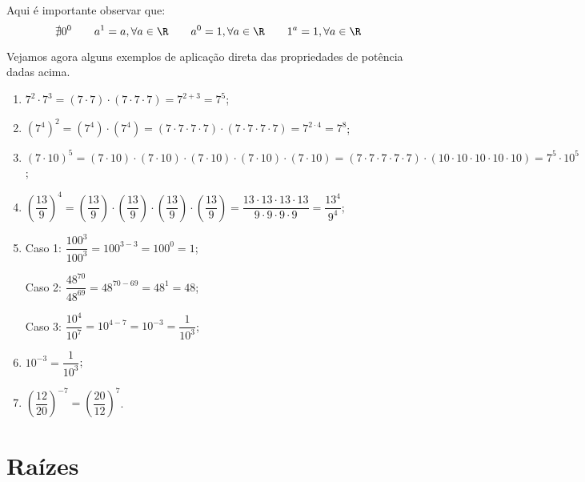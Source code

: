    \vskip0.3cm

 \colorbox{amarelo}{
 \begin{minipage}{0.9\linewidth}
 \begin{center}
 Aqui é importante observar que:
 \[
         \nexists 0^0
   \qquad a^1= a, \forall a \in \R
   \qquad a^0= 1, \forall a \in \R
   \qquad 1^a= 1, \forall a \in \R
 \]
 \end{center}
 \end{minipage}}

\vskip0.3cm

 \begin{exem} Vejamos agora alguns exemplos de aplicação direta das propriedades de potência dadas acima.
  \begin{enumerate}[P1)]
   \item $7^2 \cdot 7^3= (7 \cdot 7) \cdot (7 \cdot 7 \cdot 7)= 7^{2+3}= 7^5 $;
   \item $(7^4)^2= (7^4) \cdot (7^4)= (7 \cdot 7 \cdot 7 \cdot 7) \cdot (7 \cdot 7 \cdot 7 \cdot 7)= 7^{2 \cdot 4}= 7^8$;
   \item $(7 \cdot 10)^5= (7 \cdot 10) \cdot (7 \cdot 10) \cdot (7 \cdot 10) \cdot (7 \cdot 10) \cdot (7 \cdot 10)= (7 \cdot 7 \cdot 7 \cdot 7 \cdot 7) \cdot (10 \cdot 10 \cdot 10 \cdot 10 \cdot 10)= 7^5 \cdot 10^5$;
   \item $\left(\dfrac{13}{9}\right)^4= \left(\dfrac{13}{9}\right) \cdot \left(\dfrac{13}{9}\right) \cdot \left(\dfrac{13}{9}\right) \cdot \left(\dfrac{13}{9}\right)= \dfrac{13 \cdot 13 \cdot 13 \cdot 13}{9 \cdot 9 \cdot 9 \cdot 9}= \dfrac{13^4}{9^4}$;
   \item Caso 1: $\dfrac{100^3}{100^3}= 100^{3-3}= 100^0= 1$;

   Caso 2: $\dfrac{48^{70}}{48^{69}}= 48^{70-69}= 48^{1}= 48$;

   Caso 3: $\dfrac{10^4}{10^7}= 10^{4-7}= 10^{-3} =\dfrac{1}{10^{3}}$;

   \item $10^{-3}= \dfrac{1}{10^3}$;
   \item $\left(\dfrac{12}{20}\right)^{-7}=\left(\dfrac{20}{12}\right)^{7}$.

  \end{enumerate}

 \end{exem}


 \section{Raízes}

